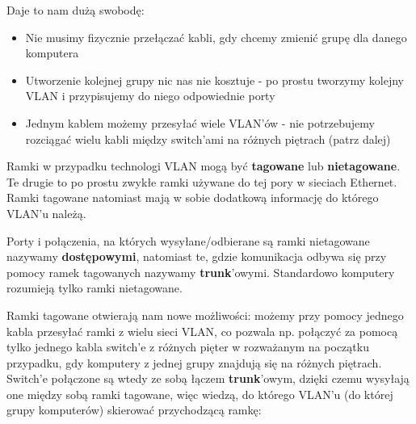 \documentclass[12pt]{article}
\begin{document}
    \noindent Daje to nam dużą swobodę:
    \begin{itemize}
        \item Nie musimy fizycznie przełączać kabli, gdy chcemy zmienić grupę dla danego komputera
        \item Utworzenie kolejnej grupy nic nas nie kosztuje - po prostu tworzymy kolejny VLAN i przypisujemy do niego odpowiednie porty
        \item Jednym kablem możemy przesyłać wiele VLAN'ów - nie potrzebujemy rozciągać wielu kabli między switch'ami na różnych piętrach (patrz dalej)
    \end{itemize}

    Ramki w przypadku technologi VLAN mogą być \textbf{tagowane} lub \textbf{nietagowane}. Te drugie to po prostu zwykłe ramki używane do tej pory w sieciach Ethernet.
    Ramki tagowane natomiast mają w sobie dodatkową informację do którego VLAN'u należą.

    Porty i połączenia, na których wysyłane/odbierane są ramki nietagowane nazywamy \textbf{dostępowymi}, natomiast te, gdzie komunikacja odbywa się
    przy pomocy ramek tagowanych nazywamy \textbf{trunk}'owymi. Standardowo komputery rozumieją tylko ramki nietagowane.

    Ramki tagowane otwierają nam nowe możliwości: możemy przy pomocy jednego kabla przesyłać ramki z wielu sieci VLAN, co pozwala np. połączyć za pomocą tylko jednego kabla
    switch'e z różnych pięter w rozważanym na początku przypadku, gdy komputery z jednej grupy znajdują się na różnych piętrach. Switch'e połączone są wtedy ze sobą łączem
    \textbf{trunk}'owym, dzięki czemu wysyłają one między sobą ramki tagowane, więc wiedzą, do którego VLAN'u (do której grupy komputerów) skierować przychodzącą ramkę:
\end{document}
